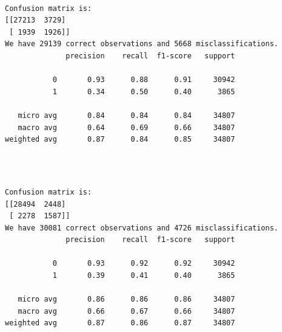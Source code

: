 \documentclass[8pt,onecolumn,aps,pra]{revtex4-1}
\begin{document}
    \begin{center}
    \end{center}
    { \hspace*{\fill} \\}
    
    \begin{Verbatim}[commandchars=\\\{\}]
Confusion matrix is:
[[27213  3729]
 [ 1939  1926]]
We have 29139 correct observations and 5668 misclassifications.
              precision    recall  f1-score   support

           0       0.93      0.88      0.91     30942
           1       0.34      0.50      0.40      3865

   micro avg       0.84      0.84      0.84     34807
   macro avg       0.64      0.69      0.66     34807
weighted avg       0.87      0.84      0.85     34807


    \end{Verbatim}

    \begin{center}
    \end{center}
    { \hspace*{\fill} \\}
    
    \begin{Verbatim}[commandchars=\\\{\}]
Confusion matrix is:
[[28494  2448]
 [ 2278  1587]]
We have 30081 correct observations and 4726 misclassifications.
              precision    recall  f1-score   support

           0       0.93      0.92      0.92     30942
           1       0.39      0.41      0.40      3865

   micro avg       0.86      0.86      0.86     34807
   macro avg       0.66      0.67      0.66     34807
weighted avg       0.87      0.86      0.87     34807


    \end{Verbatim}

    \begin{center}
    \end{center}
    { \hspace*{\fill} \\}
    
\end{document}
